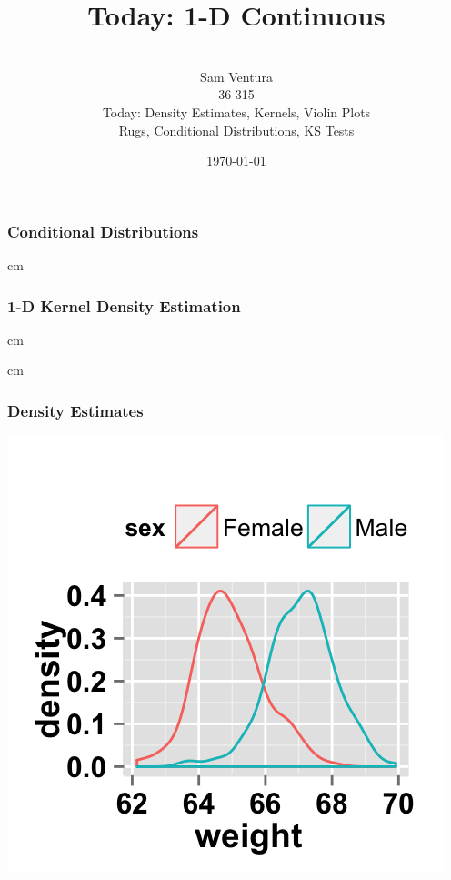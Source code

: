 \documentclass{beamer} %
\begin{document}
\title[dedup]{Today:  1-D Continuous}


\author[Samuel L. Ventura]{\\
  \large{Sam Ventura\\36-315\\Today:  Density Estimates, Kernels, Violin Plots\\ Rugs, Conditional Distributions, KS Tests}}
\date{\today}


\begin{frame}
	\maketitle
	
\end{frame}




\begin{frame}\frametitle{Conditional Distributions}
	\small
	
	
	 cm
	
\end{frame}



\begin{frame}\frametitle{1-D Kernel Density Estimation}
	\small
	
	
	 cm
	
\end{frame}




\begin{frame}
	\small
	
	
	 cm
	
\end{frame}



\begin{frame}\frametitle{Density Estimates}
	\centering
	\includegraphics[width=0.77\linewidth]{density2.png}
\end{frame}
\end{document}
